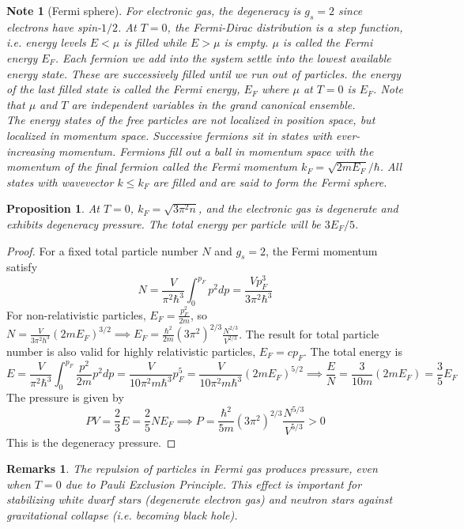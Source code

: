\documentclass[a4paper]{article}
\newtheorem{remarks}{Remarks}[section]
\newtheorem{Note}{Note}[section]
\theoremstyle{new}
\newtheorem{prop}{Proposition}[section]
\begin{document}
\begin{Note}[Fermi sphere]
For electronic gas, the degeneracy is $g_s=2$ since electrons have spin-$1/2$. At $T=0$, the Fermi-Dirac distribution is a step function, i.e. energy levels $E<\mu$ is filled while $E>\mu$ is empty. $\mu$ is called the Fermi energy $E_F$. Each fermion we add into the system settle into the lowest available energy state. These are successively filled until we run out of particles. the energy of the last filled state is called the Fermi energy, $E_F$ where $\mu$ at $T=0$ is $E_F$. Note that $\mu$ and $T$ are independent variables in the grand canonical ensemble.\\[5pt]
The energy states of the free particles are not localized in position space, but localized in momentum space. Successive fermions sit in states with ever-increasing momentum. Fermions fill out a ball in momentum space with the momentum of the final fermion called the Fermi momentum $k_F=\sqrt{2mE_F}/\hbar$. All states with wavevector $k\leq k_F$ are filled and are said to form the Fermi sphere.
\end{Note}
\begin{prop}
At $T=0$, $k_F=\sqrt{3\pi^2n}$, and the electronic gas is degenerate and exhibits degeneracy pressure. The total energy per particle will be $3E_F/5$.
\end{prop}
\begin{proof}
For a fixed total particle number $N$ and $g_s=2$, the Fermi momentum satisfy
$$N=\frac{V}{\pi^2\hbar^3}\int_0^{p_F}p^2dp=\frac{Vp_F^3}{3\pi^2\hbar^3}$$
For non-relativistic particles, $E_F=\frac{p_F^2}{2m}$, so $N=\frac{V}{3\pi^2 h^3}(2mE_F)^{3/2}\implies E_F=\frac{\hbar^2}{2m}(3\pi^2)^{2/3}\frac{N^{2/3}}{V^{2/3}}$. The result for total particle number is also valid for highly relativistic particles, $E_F=cp_F$. The total energy is
$$E=\frac{V}{\pi^2\hbar^3}\int_0^{p_F}\frac{p^2}{2m}p^2dp=\frac{V}{10\pi^2m\hbar^3}p_F^5=\frac{V}{10\pi^2m\hbar^3}(2mE_F)^{5/2}\implies\frac{E}{N}=\frac{3}{10m}(2mE_F)=\frac{3}{5}E_F$$
The pressure is given by $$PV=\frac{2}{3}E=\frac{2}{5}NE_F\implies P=\frac{\hbar^2}{5m}(3\pi^2)^{2/3}\frac{N^{5/3}}{V^{5/3}}>0$$ 
This is the degeneracy pressure.
\end{proof}
\begin{remarks}
The repulsion of particles in Fermi gas produces pressure, even when $T=0$ due to Pauli Exclusion Principle. This effect is important for stabilizing white dwarf stars (degenerate electron gas) and neutron stars against gravitational collapse (i.e. becoming black hole).
\end{remarks}
\end{document}
